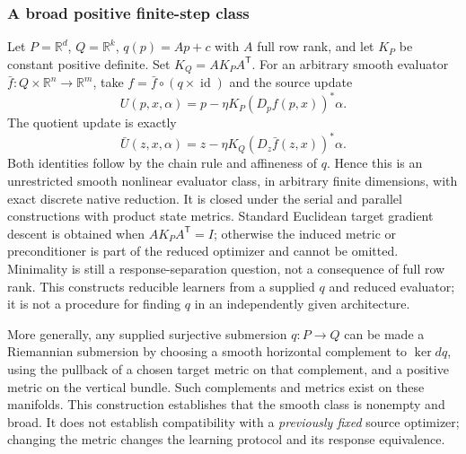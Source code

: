 \documentclass[11pt]{article}
\theoremstyle{definition}
\theoremstyle{remark}\newtheorem{remark}[theorem]{Remark}
\newcommand{\R}{\mathbb R}
\newcommand{\id}{\operatorname{id}}
\begin{document}
\subsubsection{A broad positive finite-step class}
Let $P=\R^d$, $Q=\R^k$, $q(p)=Ap+c$ with $A$ full row rank, and let
$K_P$ be constant positive definite. Set $K_Q=AK_PA^{\mathsf T}$.
For an arbitrary smooth evaluator $\bar f:Q\times\R^n\to\R^m$, take
$f=\bar f\circ(q\times\id)$ and the source update
\[
 U(p,x,\alpha)=p-\eta K_P(D_pf(p,x))^*\alpha.
\]
The quotient update is exactly
\begin{equation}\label{s:eq:affine-update}
 \bar U(z,x,\alpha)
   =z-\eta K_Q(D_z\bar f(z,x))^*\alpha.
\end{equation}
Both identities follow by the chain rule and affineness of $q$. Hence this
is an unrestricted smooth nonlinear evaluator class, in arbitrary finite
dimensions, with exact discrete native reduction. It is closed under the
serial and parallel constructions with product state metrics. Standard
Euclidean target gradient descent is obtained when $AK_PA^{\mathsf T}=I$;
otherwise the induced metric or preconditioner is part of the reduced
optimizer and cannot be omitted. Minimality is still a response-separation
question, not a consequence of full row rank.
This constructs reducible learners from a supplied $q$ and reduced evaluator;
it is not a procedure for finding $q$ in an independently given architecture.

More generally, any supplied surjective submersion $q:P\to Q$ can be made
a Riemannian submersion by choosing a smooth horizontal complement to
$\ker dq$, using the pullback of a chosen target metric on that complement,
and a positive metric on the vertical bundle. Such complements and metrics
exist on these manifolds. This construction establishes that the smooth
class is nonempty and broad. It does not establish compatibility with a
\emph{previously fixed} source optimizer; changing the metric changes the
learning protocol and its response equivalence.
\end{document}
